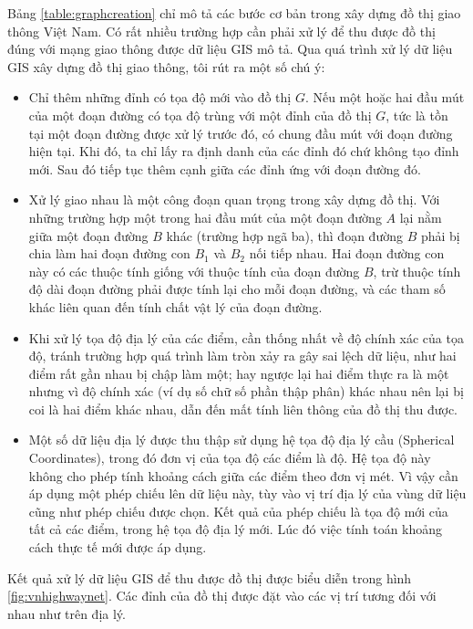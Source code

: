\documentclass[14pt, oneside, a4paper, openany]{scrartcl}
\begin{document}
Bảng \ref{table:graphcreation} chỉ mô tả các bước cơ bản trong xây dựng đồ thị giao thông Việt Nam. Có rất nhiều trường hợp cần phải xử lý để thu được đồ thị đúng với mạng giao thông được dữ liệu GIS mô tả. Qua quá trình xử lý dữ liệu GIS xây dựng đồ thị giao thông, tôi rút ra một số chú ý:
\begin{itemize}
	\item Chỉ thêm những đỉnh có tọa độ mới vào đồ thị $G$. Nếu một hoặc hai đầu mút của một đoạn đường có tọa độ trùng với một đỉnh của đồ thị $G$, tức là tồn tại một đoạn đường được xử lý trước đó, có chung đầu mút với đoạn đường hiện tại. Khi đó, ta chỉ lấy ra định danh của các đỉnh đó chứ không tạo đỉnh mới. Sau đó tiếp tục thêm cạnh giữa các đỉnh ứng với đoạn đường đó.
	
	\item Xử lý giao nhau là một công đoạn quan trọng trong xây dựng đồ thị. Với những trường hợp một trong hai đầu mút của một đoạn đường $A$ lại nằm giữa một đoạn đường $B$ khác (trường hợp ngã ba), thì đoạn đường $B$ phải bị chia làm hai đoạn đường con $B_1$ và $B_2$ nối tiếp nhau. Hai đoạn đường con này có các thuộc tính giống với thuộc tính của đoạn đường $B$, trừ thuộc tính độ dài đoạn đường phải được tính lại cho mỗi đoạn đường, và các tham số khác liên quan đến tính chất vật lý của đoạn đường.
	
	\item Khi xử lý tọa độ địa lý của các điểm, cần thống nhất về độ chính xác của tọa độ, tránh trường hợp quá trình làm tròn xảy ra gây sai lệch dữ liệu, như hai điểm rất gần nhau bị chập làm một; hay ngược lại hai điểm thực ra là một nhưng vì độ chính xác (ví dụ số chữ số phần thập phân) khác nhau nên lại bị coi là hai điểm khác nhau, dẫn đến mất tính liên thông của đồ thị thu được.
	
	\item Một số dữ liệu địa lý được thu thập sử dụng hệ tọa độ địa lý cầu (Spherical Coordinates), trong đó đơn vị của tọa độ các điểm là độ. Hệ tọa độ này không cho phép tính khoảng cách giữa các điểm theo đơn vị mét. Vì vậy cần áp dụng một phép chiếu lên dữ liệu này, tùy vào vị trí địa lý của vùng dữ liệu cũng như phép chiếu được chọn. Kết quả của phép chiếu là tọa độ mới của tất cả các điểm, trong hệ tọa độ địa lý mới. Lúc đó việc tính toán khoảng cách thực tế mới được áp dụng.
\end{itemize}

Kết quả xử lý dữ liệu GIS để thu được đồ thị được biểu diễn trong hình \ref{fig:vnhighwaynet}. Các đỉnh của đồ thị được đặt vào các vị trí tương đối với nhau như trên địa lý.
\end{document}
